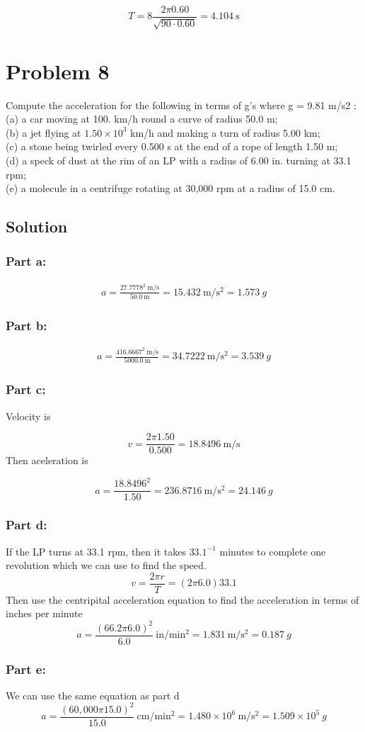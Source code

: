 \documentclass{article}
\begin{document}
\[
	T = 8 \frac{2 \pi 0.60}{\sqrt{90 \cdot 0.60}} = \boxed{4.104\ \text{s}}
\]


\section*{Problem 8}
Compute the acceleration for the following in terms of g's where g = 9.81 m/s2 :\\ (a) a car
moving at 100. km/h round a curve of radius 50.0 m;\\ (b) a jet flying at $1.50\times10^3$ km/h and
making a turn of radius 5.00 km;\\ (c) a stone being twirled every 0.500 s at the end of a rope of
length 1.50 m;\\ (d) a speck of dust at the rim of an LP with a radius of 6.00 in. turning at 33.1
rpm;\\ (e) a molecule in a centrifuge rotating at 30,000 rpm at a radius of 15.0 cm.

\subsection*{Solution}
\subsubsection*{Part a:}
\begin{align*}
	a = \frac{27.7778^2\ \text{m/s}}{50.0\ \text{m}} =  15.432\ \text{m}/\text{s}^2 = \boxed{1.573\ g}
\end{align*}

\subsubsection*{Part b:}
\begin{align*}
	a = \frac{416.6667^2\ \text{m/s}}{5000.0\ \text{m}} =  34.7222\ \text{m}/\text{s}^2 = \boxed{3.539\ g}
\end{align*}

\subsubsection*{Part c:}
Velocity is

\[
	v = \frac{2 \pi 1.50}{0.500} = 18.8496\ \text{m}/\text{s}
\]
Then aceleration is

\[
	a = \frac{18.8496^2}{1.50} = 236.8716\ \text{m}/\text{s}^2 = \boxed{24.146\ g}
\]

\subsubsection*{Part d:}
If the LP turns at 33.1 rpm, then it takes $33.1^{-1}$ minutes to complete one revolution which we can use to find the speed.
\[
	v = \frac{2 \pi r}{T} = \left(2 \pi 6.0 \right) 33.1
\]
Then use the centripital acceleration equation to find the acceleration in terms of inches per minute
\[
	a = \frac{\left( 66.2 \pi 6.0 \right)^2}{6.0}\ \text{in}/\text{min}^2 = 1.831\ \text{m}/\text{s}^2 = 0.187\ g
\]

\subsubsection*{Part e:}
We can use the same equation as part d
\[
	a = \frac{\left(60,000 \pi 15.0\right)^2}{15.0}\ \text{cm}/\text{min}^2 = 1.480 \times 10^6\ \text{m}/\text{s}^2 = 1.509 \times 10^5\ g
\]
\end{document}
